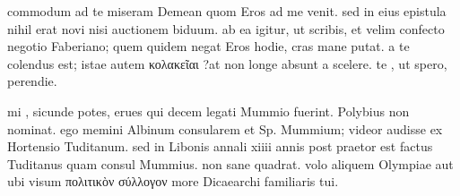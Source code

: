 


 commodum ad te miseram Demean quom Eros ad me venit. sed in eius epistula nihil erat novi nisi auctionem biduum. ab ea igitur, ut scribis, et velim confecto negotio Faberiano; quem quidem negat Eros hodie, cras mane putat. a te colendus est; istae autem κολακεῖαι ?at non longe absunt a scelere. te , ut spero, perendie.

 mi , sicunde potes, erues qui decem legati Mummio fuerint. Polybius non nominat. ego memini Albinum consularem et Sp. Mummium; videor audisse ex Hortensio Tuditanum. sed in Libonis annali xiiii annis post praetor est factus Tuditanus quam consul Mummius. non sane quadrat. volo aliquem Olympiae aut ubi visum πολιτικὸν σύλλογον more Dicaearchi familiaris tui.
